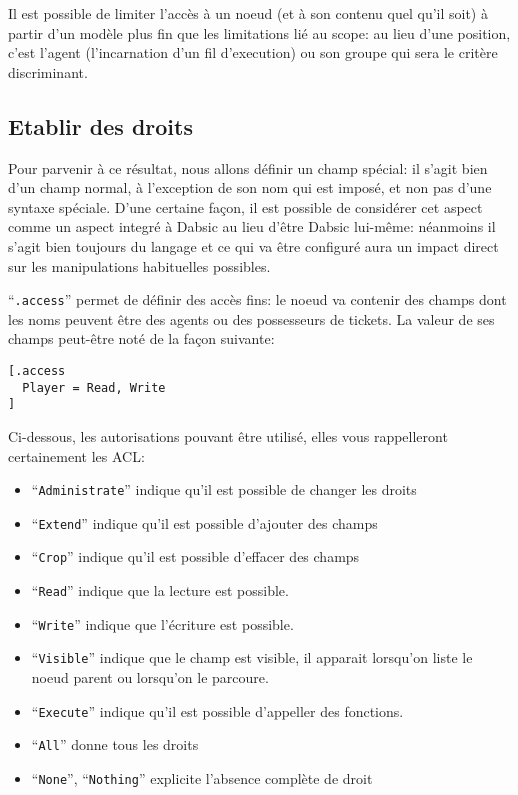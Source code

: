 \documentclass[a5paper, 12pt]{book}
\begin{document}
Il est possible de limiter l'accès à un noeud (et à son
contenu quel qu'il soit) à partir d'un modèle plus fin
que les limitations lié au scope: au lieu d'une position,
c'est l'agent (l'incarnation d'un fil d'execution) ou
son groupe qui sera le critère discriminant.

\subsection{Etablir des droits}

Pour parvenir à ce résultat, nous allons définir un champ
spécial: il s'agit bien d'un champ normal, à l'exception
de son nom qui est imposé, et non pas d'une syntaxe spéciale.
D'une certaine façon, il est possible de considérer cet
aspect comme un aspect integré à Dabsic au lieu d'être
Dabsic lui-même: néanmoins il s'agit bien toujours du langage
et ce qui va être configuré aura un impact direct sur
les manipulations habituelles possibles.

``\verb!.access!'' permet de définir des accès fins:
le noeud va contenir des champs dont les noms
peuvent être des agents ou des possesseurs
de tickets. La valeur de ses champs peut-être noté de la
façon suivante:\\

\begin{verbatim}
[.access
  Player = Read, Write
]
\end{verbatim}

Ci-dessous, les autorisations pouvant être utilisé,
elles vous rappelleront certainement les ACL:

\begin{itemize}
  \item ``\verb!Administrate!'' indique qu'il est possible de changer les droits
  \item ``\verb!Extend!'' indique qu'il est possible d'ajouter des champs
  \item ``\verb!Crop!'' indique qu'il est possible d'effacer des champs
  \item ``\verb!Read!'' indique que la lecture est possible.
  \item ``\verb!Write!'' indique que l'écriture est possible.
  \item ``\verb!Visible!'' indique que le champ est visible,
    il apparait lorsqu'on liste le noeud parent ou
    lorsqu'on le parcoure.
  \item ``\verb!Execute!'' indique qu'il est possible d'appeller
    des fonctions.
  \item ``\verb!All!'' donne tous les droits
  \item ``\verb!None!'', ``\verb!Nothing!'' explicite l'absence complète de droit
\end{itemize}
\end{document}
